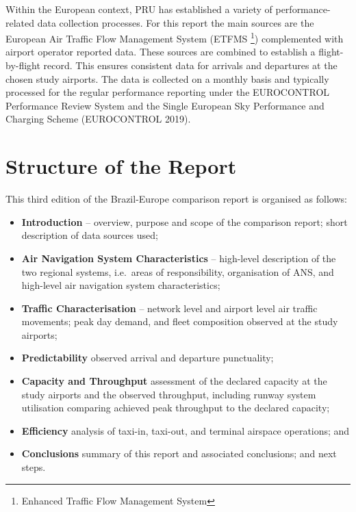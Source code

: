 \documentclass[
  a4paper,
  DIV=11,
  numbers=noendperiod]{scrreport}
\providecommand{\tightlist}{%
  \setlength{\itemsep}{0pt}\setlength{\parskip}{0pt}}\usepackage{longtable,booktabs,array}
\begin{document}
Within the European context, PRU has established a variety of
performance-related data collection processes. For this report the main
sources are the European Air Traffic Flow Management System (ETFMS
\footnote{Enhanced Traffic Flow Management System}) complemented with
airport operator reported data. These sources are combined to establish
a flight-by-flight record. This ensures consistent data for arrivals and
departures at the chosen study airports. The data is collected on a
monthly basis and typically processed for the regular performance
reporting under the EUROCONTROL Performance Review System and the Single
European Sky Performance and Charging Scheme (EUROCONTROL 2019).

\hypertarget{structure-of-the-report}{%
\section{Structure of the Report}\label{structure-of-the-report}}

This third edition of the Brazil-Europe comparison report is organised
as follows:

\begin{itemize}
\tightlist
\item
  \textbf{Introduction} -- overview, purpose and scope of the comparison
  report; short description of data sources used;
\item
  \textbf{Air Navigation System Characteristics} -- high-level
  description of the two regional systems, i.e.~areas of responsibility,
  organisation of ANS, and high-level air navigation system
  characteristics;
\item
  \textbf{Traffic Characterisation} -- network level and airport level
  air traffic movements; peak day demand, and fleet composition observed
  at the study airports;
\item
  \textbf{Predictability} observed arrival and departure punctuality;
\item
  \textbf{Capacity and Throughput} assessment of the declared capacity
  at the study airports and the observed throughput, including runway
  system utilisation comparing achieved peak throughput to the declared
  capacity;
\item
  \textbf{Efficiency} analysis of taxi-in, taxi-out, and terminal
  airspace operations; and
\item
  \textbf{Conclusions} summary of this report and associated
  conclusions; and next steps.
\end{itemize}
\end{document}
